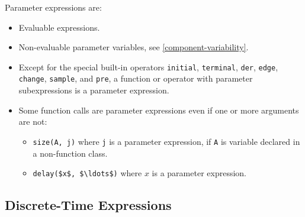 Parameter expressions are:
\begin{itemize}
\item
  Evaluable expressions.
\item
  Non-evaluable parameter variables, see \cref{component-variability}.
\item
  Except for the special built-in operators \lstinline!initial!, \lstinline!terminal!, \lstinline!der!, \lstinline!edge!, \lstinline!change!, \lstinline!sample!, and \lstinline!pre!, a function or operator with parameter subexpressions is a parameter expression.
\item
  Some function calls are parameter expressions even if one or more arguments are not:
  \begin{itemize}
  \item
    \lstinline!size(A, j)! where \lstinline!j! is a parameter expression, if \lstinline!A! is variable declared in a non-function class.
  \item
    \lstinline!delay($x$, $\ldots$)! where $x$ is a parameter expression.
  \end{itemize}
\end{itemize}

\subsection{Discrete-Time Expressions}\label{discrete-time-expressions}

